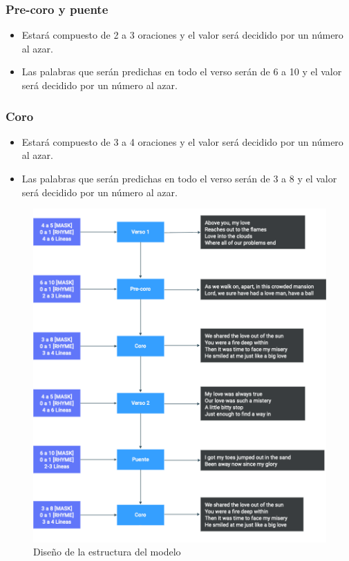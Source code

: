 \documentclass[12pt, a4paper, titlepage]{report}
\begin{document}
		\subsubsection*{Pre-coro y puente}
		\begin{itemize}
			\item Estará compuesto de 2 a 3 oraciones y el valor será decidido por un número al azar.
			\item Las palabras que serán predichas en todo el verso serán de 6 a 10 y el valor será decidido por un número al azar.
		\end{itemize}
	
		\subsubsection*{Coro}
		\begin{itemize}
			\item Estará compuesto de 3 a 4 oraciones y el valor será decidido por un número al azar.
			\item Las palabras que serán predichas en todo el verso serán de 3 a 8 y el valor será decidido por un número al azar.
		\end{itemize}
		
		\begin{figure}[H]
			\includegraphics[width=15cm]{./imagenes/Disenio/Arquitectura/Generacion_letras.png}
			\centering 
			\caption{Diseño de la estructura del modelo}
		\end{figure}
		
\end{document}
